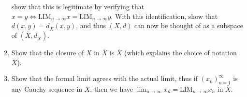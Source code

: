 \begin{exercise}
\begin{enumerate}
              show that this is legitimate by verifying that \(x = y \iff \text{LIM}_{n \to \infty} x = \text{LIM}_{n \to \infty} y\).
              With this identification, show that \(d(x, y) = d_{\overline{X}}(x, y)\), and thus \((X, d)\) can now be thought of as a subspace of \((\overline{X}, d_{\overline{X}})\).
        \item Show that the closure of \(X\) in \(\overline{X}\) is \(\overline{X}\) (which explains the choice of notation \(\overline{X}\)).
        \item Show that the formal limit agrees with the actual limit, thus if \((x_n)_{n = 1}^\infty\) is any Cauchy sequence in \(X\), then we have \(\lim_{n \to \infty} x_n = \text{LIM}_{n \to \infty} x_n\) in \(\overline{X}\).
    \end{enumerate}
\end{exercise}